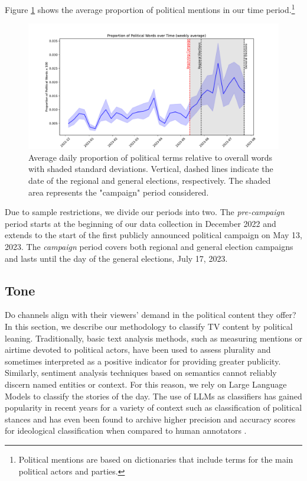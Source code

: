 \documentclass[12pt]{article}
\begin{document}
Figure \ref{fig:coverage} shows the average proportion of political mentions in our time period.\footnote{Political mentions are based on dictionaries that include terms for the main political actors and parties.}

\begin{figure}[h!]
	
	\centering
	\includegraphics[width=150mm]{figures/political_words2}
	\caption{Average daily proportion of political terms relative to overall words with shaded standard deviations. Vertical, dashed lines indicate the date of the regional and general elections, respectively. The shaded area represents the "campaign" period considered.}
	\label{fig:coverage}
\end{figure}

Due to sample restrictions, we divide our periods into two. The \textit{pre-campaign} period starts at the beginning of our data collection in December 2022 and extends to the start of the first publicly announced political campaign on May 13, 2023. The \textit{campaign} period covers both regional and general election campaigns and lasts until the day of the general elections, July 17, 2023.


\subsection{ Tone}


Do channels align with their viewers' demand in the political content they offer? In this section, we describe our methodology to classify TV content by political leaning. Traditionally, basic text analysis methods, such as measuring mentions or airtime devoted to political actors, have been used to assess plurality and sometimes interpreted as a positive indicator for providing greater publicity. Similarly, sentiment analysis techniques based on semantics cannot reliably discern named entities or context. For this reason, we rely on Large Language Models to classify the stories of the day. The use of LLMs as classifiers has gained popularity in recent years for a variety of context such as classification of political stances \citep{lemens} and has even been found to archive higher precision and accuracy scores for ideological classification when compared to human annotators \citep{tornberg2023}.
\end{document}
